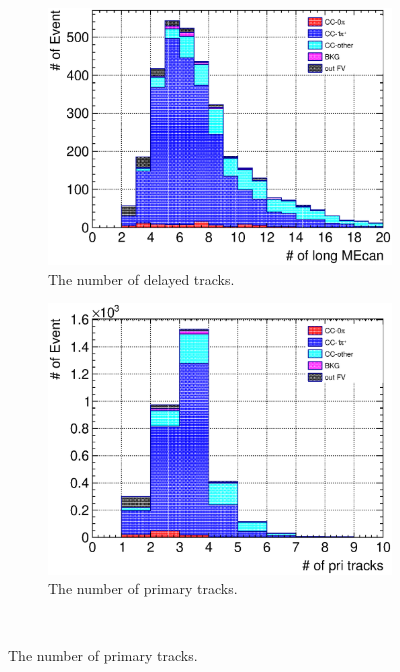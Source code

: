 \begin{figure}
  \\
  \begin{subfigure}{\dbfigwid\textwidth}
       \includegraphics[width=\textwidth]{figures/sel/TPCmu_nsdptrk_stack_al8.eps}
       \caption{The number of delayed tracks.}
       \label{subfig:tlpi-trknum-delayed}
  \end{subfigure}
  \begin{subfigure}{\dbfigwid\textwidth}
       \includegraphics[width=\textwidth]{figures/sel/TPCmu_npri_stack_al8.eps}
       \caption{The number of primary tracks.}
       \label{subfig:tlpi-trknum-pri}
  \end{subfigure}
  \\

\end{figure}
